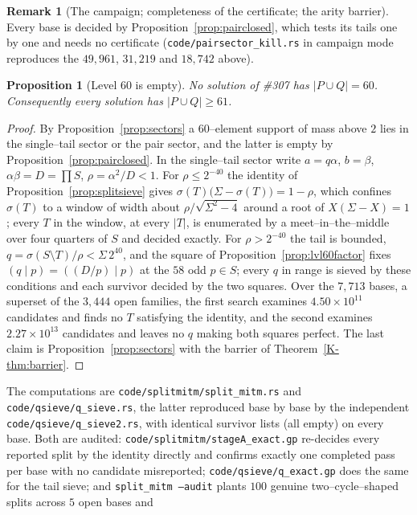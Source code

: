 \documentclass[11pt]{article}
\newtheorem{proposition}[theorem]{Proposition}
\theoremstyle{definition}
\newtheorem{remark}[theorem]{Remark}
\begin{document}
\begin{remark}[The campaign; completeness of the certificate; the arity barrier]
Every base is decided by Proposition~\ref{prop:pairclosed}, which tests its tails one by one and needs no certificate
(\texttt{code/pairsector\_kill.rs} in campaign mode reproduces the $49{,}961$, $31{,}219$ and $18{,}742$ above).
\end{remark}

\begin{proposition}[Level $60$ is empty]\label{prop:level60closed}
No solution of \#307 has $|P\cup Q|=60$. Consequently every solution has $|P\cup Q|\ge61$.
\end{proposition}
\begin{proof}
By Proposition~\ref{prop:sectors} a $60$--element support of mass above $2$ lies in the single--tail sector or the pair
sector, and the latter is empty by Proposition~\ref{prop:pairclosed}. In the single--tail sector write
$a=q\alpha$, $b=\beta$, $\alpha\beta=D=\prod S$, $\rho=\alpha^{2}/D<1$. For $\rho\le2^{-40}$ the identity of
Proposition~\ref{prop:splitsieve} gives $\sigma(T)\bigl(\Sigma-\sigma(T)\bigr)=1-\rho$, which confines $\sigma(T)$ to a window of
width about $\rho/\sqrt{\Sigma^{2}-4}$ around a root of $X(\Sigma-X)=1$; every $T$ in the window, at every $|T|$, is enumerated by
a meet--in--the--middle over four quarters of $S$ and decided exactly. For $\rho>2^{-40}$ the tail is bounded,
$q=\sigma(S\setminus T)/\rho<\Sigma\,2^{40}$, and the square of Proposition~\ref{prop:lvl60factor} fixes $(q\mid p)=((D/p)\mid p)$
at the $58$ odd $p\in S$; every $q$ in range is sieved by these conditions and each survivor decided by the two squares.
Over the $7{,}713$ bases, a superset of the $3{,}444$ open families, the first search examines $4.50\times10^{11}$
candidates and finds no $T$ satisfying the identity, and the second examines $2.27\times10^{13}$ candidates and leaves no
$q$ making both squares perfect. The last claim is Proposition~\ref{prop:sectors} with the barrier of
Theorem~\ref{K-thm:barrier}.
\end{proof}
The computations are \texttt{code/splitmitm/split\_mitm.rs} and \texttt{code/qsieve/q\_sieve.rs}, the latter reproduced base
by base by the independent \texttt{code/qsieve/q\_sieve2.rs}, with identical survivor lists (all empty) on every base.
Both are audited: \texttt{code/splitmitm/stageA\_exact.gp} re-decides every reported split by the identity directly and
confirms exactly one completed pass per base with no candidate misreported; \texttt{code/qsieve/q\_exact.gp} does the same
for the tail sieve; and \texttt{split\_mitm --audit} plants $100$ genuine two--cycle--shaped splits across $5$ open bases and
\end{document}
